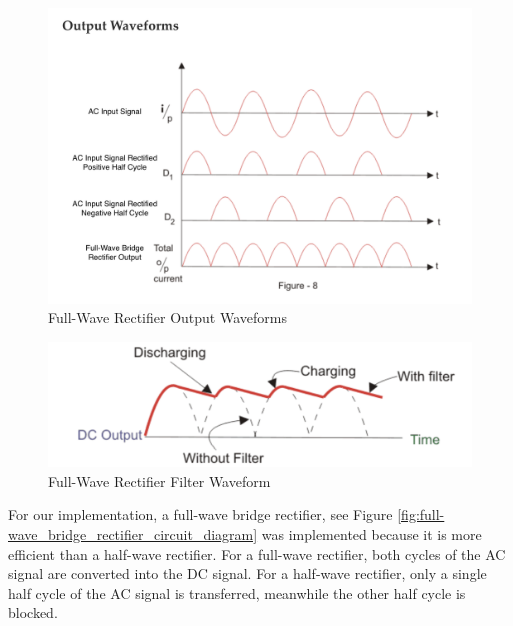 \documentclass[conference]{IEEEtran}
\begin{document}
\begin{figure}[htp]
    \centering
    \includegraphics[width=1.0\linewidth]{full-wave_bridge_rectifier_output_waveform.png}
    \caption{Full-Wave Rectifier Output Waveforms}
    \label{fig:full-wave_rectifier_output_waveform_diagram}
\end{figure}

\begin{figure}[h]
    \centering
    \includegraphics[width=1.0\linewidth]{full-wave_bridge_rectifier_filter_waveform.png}
    \caption{Full-Wave Rectifier Filter Waveform}
    \label{fig:full-wave_bridge_rectifier_filter_waveform_diagram}
\end{figure}


For our implementation, a full-wave bridge rectifier, see Figure \ref{fig:full-wave_bridge_rectifier_circuit_diagram} was implemented because it is more efficient than a half-wave rectifier. For a full-wave rectifier, both cycles of the AC signal are converted into the DC signal. For a half-wave rectifier, only a single half cycle of the AC signal is transferred, meanwhile the other half cycle is blocked. 
\end{document}
